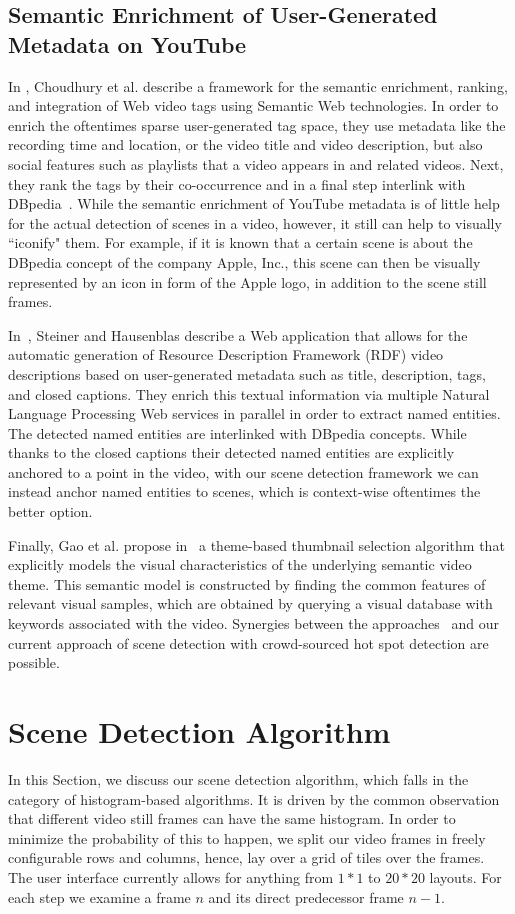 \documentclass[10pt,twocolumn,letterpaper]{article}
\begin{document}
\subsection{Semantic Enrichment of User-Generated Metadata on YouTube}
In \cite{Choudhury:YouTube}, Choudhury et al. describe a framework for the semantic enrichment, ranking, and integration of Web video tags using Semantic Web technologies. In order to enrich the oftentimes sparse user-generated tag space, they use metadata like the recording time and location, or the video title and video description, but also social features such as playlists that a video appears in and related videos. Next, they rank the tags by their co-occurrence and in a final step interlink with DBpedia~\cite{Bizer:DBpedia}. While the semantic enrichment of YouTube metadata is of little help for the actual detection of scenes in a video, however, it still can help to visually ``iconify" them. For example, if it is known that a certain scene is about the DBpedia concept of the company Apple, Inc., this scene can then be visually represented by an icon in form of the Apple logo, in addition to the scene still frames.

In~\cite{semwebvid}, Steiner and Hausenblas describe a Web application that allows for the automatic generation of Resource Description Framework (RDF) video descriptions based on user-generated metadata such as title, description, tags, and closed captions. They enrich this textual information via multiple Natural Language Processing Web services in parallel in order to extract named entities. The detected named entities are interlinked with DBpedia concepts. While thanks to the closed captions their detected named entities are explicitly anchored to a point in the video, with our scene detection framework we can instead anchor named entities to scenes, which is context-wise oftentimes the better option.

Finally, Gao et al. propose in~\cite{Gao:2009} a theme-based thumbnail selection algorithm that explicitly models the visual characteristics of the underlying semantic video theme. This semantic model is constructed by finding the common features of relevant visual samples, which are obtained by querying a visual database with keywords associated with the video. Synergies between the approaches~\cite{Choudhury:YouTube,Gao:2009,semwebvid} and our current approach of scene detection with crowd-sourced hot spot detection are possible.

\section{Scene Detection Algorithm} \label{sec:details-of-algo}
In this Section, we discuss our scene detection algorithm, which falls in the category of histogram-based algorithms.  It is driven by the common observation that different video still frames can have the same histogram. In order to minimize the probability of this to happen, we split our video frames in freely configurable rows and columns, hence, lay over a grid of tiles over the frames. The user interface currently allows for anything from $1 * 1$ to $20 * 20$ layouts. For each step we examine a frame $n$ and its direct predecessor frame $n - 1$.
\end{document}
